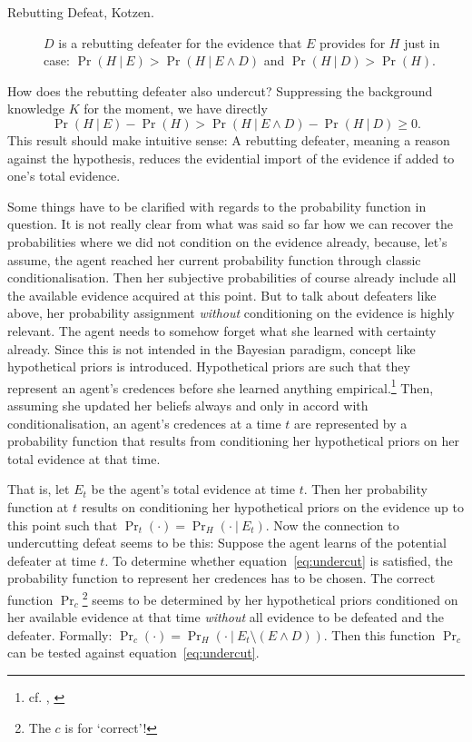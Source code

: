 \documentclass[11pt, a4paper]{scrartcl}
\newcommand{\given}[1][]{\:#1\vert\:}
\renewcommand{\i}[1]{\emph{#1}}
\begin{document}
\begin{description}
    \item[Rebutting Defeat, Kotzen.] $D$ is a rebutting defeater for the evidence that $E$ provides for $H$ just in case: $\Pr(H \given E) > \Pr(H \given E \land D)$ and $\Pr(H \given D) > \Pr(H)$.
\end{description}

How does the rebutting defeater also undercut? Suppressing the background knowledge $K$ for the moment, we have directly 
\[{ \Pr(H \given E) - \Pr(H)  >  \Pr(H \given E \land D) - \Pr(H\given D)  \geqslant 0.}\]
This result should make intuitive sense: A rebutting defeater, meaning a reason against the hypothesis, reduces the evidential import of the evidence if added to one's total evidence. 

Some things have to be clarified with regards to the probability function in question. It is not really clear from what was said so far how we can recover the probabilities where we did not condition on the evidence already, because, let's assume, the agent reached her current probability function through classic conditionalisation. Then her subjective probabilities of course already include all the available evidence acquired at this point. But to talk about defeaters like above, her probability assignment \i{without} conditioning on the evidence is highly relevant. The agent needs to somehow forget what she learned with certainty already. Since this is not intended in the Bayesian paradigm, concept like hypothetical priors is introduced. Hypothetical priors are such that they represent an agent's credences before she learned anything empirical.\footnote{cf. \textcite[Ch. 4]{Levi1980}, \textcite[110]{Titelbaum2017}} Then, assuming she updated her beliefs always and only in accord with conditionalisation, an agent's credences at a time $t$ are represented by a probability function that results from conditioning her hypothetical priors on her total evidence at that time.

That is, let $E_t$ be the agent's total evidence at time $t$. Then her probability function at $t$ results on conditioning her hypothetical priors on the evidence up to this point such that $\Pr_t(\cdot) = \Pr_H(\cdot \given E_t)$. Now the connection to undercutting defeat seems to be this: Suppose the agent learns of the potential defeater at time $t$. To determine whether equation~\ref{eq:undercut} is satisfied, the probability function to represent her credences has to be chosen. The correct function $\Pr_c$\footnote{The $c$ is for `correct'!} seems to be determined by her hypothetical priors conditioned on her available evidence at that time \i{without} all evidence to be defeated and the defeater. Formally: $ \Pr_c(\cdot) = \Pr_H (\cdot \given E_t \setminus (E \land D))$. Then this function $\Pr_c$ can be tested against equation~\ref{eq:undercut}.
\end{document}
